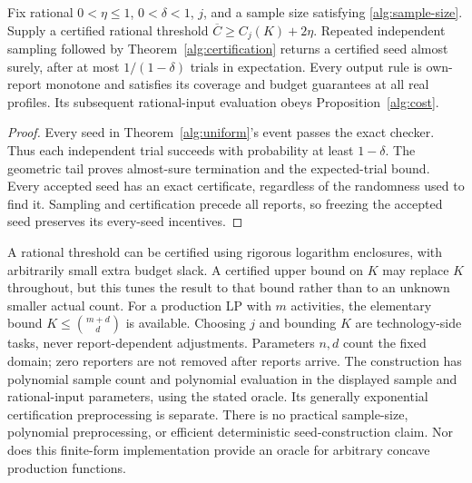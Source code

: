 \begin{corollary}
\label{alg:las-vegas}
Fix rational $0<\eta\le1$, $0<\delta<1$, $j$, and a sample size satisfying
\eqref{alg:sample-size}.  Supply a certified rational threshold
$\overline C\ge C_j(K)+2\eta$.
Repeated independent sampling followed by Theorem~\ref{alg:certification}
returns a certified seed almost surely, after at most $1/(1-\delta)$ trials
in expectation.  Every output rule is own-report monotone and satisfies its
coverage and budget guarantees at all real profiles.  Its subsequent
rational-input evaluation obeys Proposition~\ref{alg:cost}.
\end{corollary}
\begin{proof}
Every seed in Theorem~\ref{alg:uniform}'s event passes the exact checker.
Thus each independent trial succeeds with probability at least $1-\delta$.
The geometric tail proves almost-sure termination and the expected-trial
bound.  Every accepted seed has an exact certificate, regardless of the
randomness used to find it.  Sampling and certification precede all reports,
so freezing the accepted seed preserves its every-seed incentives.
\end{proof}
A rational threshold can be certified using rigorous logarithm enclosures,
with arbitrarily small extra budget slack.  A certified upper bound on $K$
may replace $K$ throughout, but this tunes the result to that bound rather
than to an unknown smaller actual count.  For a production LP with $m$
activities, the elementary bound $K\le\binom{m+d}{d}$ is available.
Choosing $j$ and bounding $K$ are technology-side tasks, never report-dependent
adjustments.  Parameters $n,d$ count the fixed domain; zero reporters are not
removed after reports arrive.
The construction has polynomial sample count and polynomial evaluation in
the displayed sample and rational-input parameters, using the stated oracle.
Its generally exponential certification preprocessing is separate.  There is
no practical sample-size, polynomial preprocessing, or efficient deterministic
seed-construction claim.  Nor does this finite-form implementation provide an
oracle for arbitrary concave production functions.
